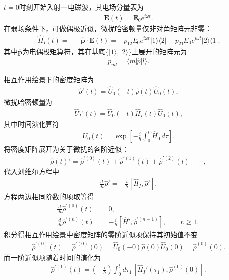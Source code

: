 \documentclass[a4paper, 10pt]{article}
\begin{document}
\begin{multicols*}{2}
$t=0$时刻开始入射一电磁波，其电场分量表为
\begin{align}
    \bm{E}(t)=\bm{E}_0e^{i\omega t}.
\end{align}
在弱场条件下，可做偶极近似，微扰哈密顿量仅非对角矩阵元非零：
\begin{align}
    \label{perturbed-Hamiltonian}
    \hat{H}_I(t)=&-\hat{\bm{p}}\cdot\bm{E}(t)=-p_{12}E_0e^{i\omega t}\lvert 1\rangle\langle 2\rvert-p_{21}E_0e^{i\omega t}\lvert 2\rangle\langle 1\rvert.
\end{align}
其中$\hat{\bm{p}}$为电偶极矩算符，其在基底$\{\lvert 1\rangle,\lvert 2\rangle\}$上展开的矩阵元为
\begin{align}
    p_{ml}=\langle m\rvert\hat{p}\rvert l\rangle.
\end{align}

相互作用绘景下的密度矩阵为
\begin{align}
    \hat{\rho}'(t)=\hat{U}_0(-t)\hat{\rho}(t)\hat{U}_0(t),
\end{align}
微扰哈密顿量为
\begin{align}
    \hat{U}_I'(t)=\hat{U}_0(-t)\hat{H}_I(t)\hat{U}_0(t),
\end{align}
其中时间演化算符
\begin{align}
    U_0(t)=\exp\left[-\frac{i}{\hbar}\int_0^t\hat{H}_0\,d\tau\right].
\end{align}
将密度矩阵展开为关于微扰的各阶近似：
\begin{align}
    \hat{\rho}(t)'=\hat{\rho}^{'(0)}(t)+\hat{\rho}^{'(1)}(t)+\hat{\rho}^{'(2)}(t)+\cdots,
\end{align}
代入刘维尔方程中
\begin{align}
    \frac{d}{dt}\hat{\rho}'=-\frac{i}{\hbar}[\hat{H}_I,\hat{\rho}'],
\end{align}
方程两边相同阶数的项取等得
\begin{align}
    \frac{d}{dt}\hat{\rho}^{'(0)}(t)=&0,\\
    \frac{d}{dt}\hat{\rho}^{'(n)}(t)=&-\frac{i}{\hbar}\left[\hat{H}',\hat{\rho}^{'(n-1)}\right],\qquad n\geq 1,
\end{align}
积分得相互作用绘景中密度矩阵的零阶近似项保持其初始值不变
\begin{align}
    \hat{\rho}^{'(0)}(t)=\hat{\rho}^{'(0)}(0)=\hat{U}_0(-0)\hat{\rho}(0)\hat{U}_0(0)=\hat{\rho}^{(0)}(0).
\end{align}
而一阶近似项随着时间的演化为
\begin{align}
    \hat{\rho}^{'(1)}(t)=\left(-\frac{i}{\hbar}\right)\int_0^td\tau_1\,[\hat{H}_I'(\tau_1),\hat{\rho}^{(0)}(0)].

\end{align}
\end{multicols*}
\end{document}
